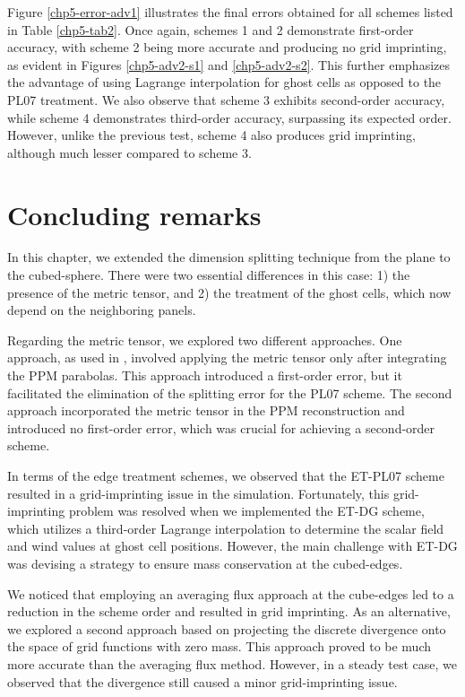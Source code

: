 Figure \ref{chp5-error-adv1} illustrates 
the final errors obtained for all schemes listed in Table \ref{chp5-tab2}. Once again, 
schemes 1 and 2 demonstrate first-order accuracy, with scheme 2 being more accurate and 
producing no grid imprinting, as evident in Figures \ref{chp5-adv2-s1} and 
\ref{chp5-adv2-s2}. This further emphasizes the advantage of using Lagrange interpolation 
for ghost cells as opposed to the PL07 treatment.
We also observe that scheme 3 exhibits second-order accuracy, while scheme 4 demonstrates 
third-order accuracy, surpassing its expected order. However, unlike the previous test, 
scheme 4 also produces grid imprinting, although much lesser compared to scheme 3.

\section{Concluding remarks}
\label{chp-cs-conc}
In this chapter, we extended the dimension splitting technique from the plane to the 
cubed-sphere. There were two essential differences in this case: 1) the presence of the 
metric tensor, and 2) the treatment of the ghost cells, which now depend on the neighboring 
panels.

Regarding the metric tensor, we explored two different approaches. One approach, as used in 
\citet{putman:2007}, involved applying the metric tensor only after integrating the PPM parabolas. 
This approach introduced a first-order error, but it facilitated the elimination of the 
splitting error for the PL07 scheme. The second approach incorporated the metric tensor in 
the PPM reconstruction and introduced no first-order error, which was crucial for achieving 
a second-order scheme.

In terms of the edge treatment schemes, we observed that the ET-PL07 scheme resulted in a 
grid-imprinting issue in the simulation. Fortunately, this grid-imprinting problem was 
resolved when we implemented the ET-DG scheme, which utilizes a third-order Lagrange 
interpolation to determine the scalar field and wind values at ghost cell positions. 
However, the main challenge with ET-DG was devising a strategy to ensure mass 
conservation at the cubed-edges.

We noticed that employing an averaging flux approach at the cube-edges led to a reduction 
in the scheme order and resulted in grid imprinting. As an alternative, we explored a 
second approach based on projecting the discrete divergence onto the space of grid 
functions with zero mass. This approach proved to be much more accurate than the averaging 
flux method. However, in a steady test case, we observed that the divergence still caused a 
minor grid-imprinting issue.

\fi